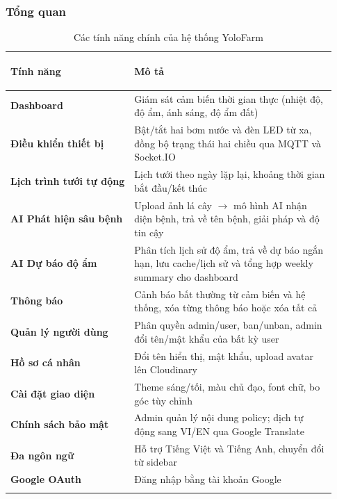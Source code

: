 \subsubsection{Tổng quan}
    \begin{longtable}{|P{0.35\linewidth}|m{0.58\linewidth}|}
        \hline
        \textbf{Tính năng} & \begin{center}\textbf{Mô tả}\end{center} \\
        \hline
        \textbf{Dashboard} & Giám sát cảm biến thời gian thực (nhiệt độ, độ ẩm, ánh sáng, độ ẩm đất) \\
        \hline
        \textbf{Điều khiển thiết bị} & Bật/tắt hai bơm nước và đèn LED từ xa, đồng bộ trạng thái hai chiều qua MQTT và Socket.IO \\
        \hline
        \textbf{Lịch trình tưới tự động} & Lịch tưới theo ngày lặp lại, khoảng thời gian bắt đầu/kết thúc \\
        \hline
        \textbf{AI Phát hiện sâu bệnh} & Upload ảnh lá cây $\rightarrow$ mô hình AI nhận diện bệnh, trả về tên bệnh, giải pháp và độ tin cậy \\
        \hline
        \textbf{AI Dự báo độ ẩm} & Phân tích lịch sử độ ẩm, trả về dự báo ngắn hạn, lưu cache/lịch sử và tổng hợp weekly summary cho dashboard \\
        \hline
        \textbf{Thông báo} & Cảnh báo bất thường từ cảm biến và hệ thống, xóa từng thông báo hoặc xóa tất cả \\
        \hline
        \textbf{Quản lý người dùng} & Phân quyền admin/user, ban/unban, admin đổi tên/mật khẩu của bất kỳ user \\
        \hline
        \textbf{Hồ sơ cá nhân} & Đổi tên hiển thị, mật khẩu, upload avatar lên Cloudinary \\
        \hline
        \textbf{Cài đặt giao diện} & Theme sáng/tối, màu chủ đạo, font chữ, bo góc tùy chỉnh \\
        \hline
        \textbf{Chính sách bảo mật} & Admin quản lý nội dung policy; dịch tự động sang VI/EN qua Google Translate \\
        \hline
        \textbf{Đa ngôn ngữ} & Hỗ trợ Tiếng Việt và Tiếng Anh, chuyển đổi từ sidebar \\
        \hline
        \textbf{Google OAuth} & Đăng nhập bằng tài khoản Google \\
        \hline
        \caption{Các tính năng chính của hệ thống YoloFarm}
    \end{longtable}


